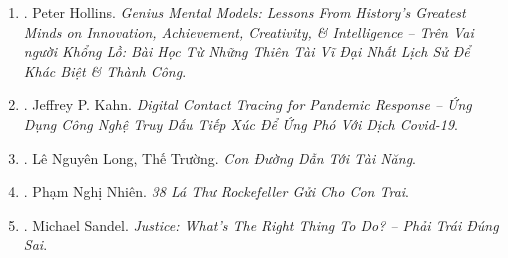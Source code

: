 \documentclass{article}
\begin{document}
\begin{enumerate}
	{\sc Peter Hollins} has studied psychology \& peak human performance for over a dozen years. This book represents scientifically proven methods he has used to become an expert in multiple domains.
	
	Most helpful mental models directly from their sources.
	\begin{itemize}
		\item How {\sc Einstein}'s hobbies helped his genius.
		\item {\sc Napoleon}'s key to conquering nations \& cementing legacy (củng cố di sản).
		\item What {\sc Descartes} had to say about demons.
		\item {\sc Darwin}'s Golden Rule \& how it changed his life.
		\item {\sc Tesla, Edison}, \& battle of approaches \& philosophies.
		\item {\sc Copernicus, Galileo}, \& values of non-convention.
		\item {\sc Sun Tzu}'s imagination of wartime strategies to daily life
		\item {\sc Mozart} \& value of being an empty pitcher to be filled to brim
		\item Unique team that {\sc Abraham Lincoln} surrounded himself with.
	\end{itemize}
	
	\item \cite{Hollins_genius_mental_models_VN}. {\sc Peter Hollins}. {\it Genius Mental Models: Lessons From History's Greatest Minds on Innovation, Achievement, Creativity, \& Intelligence -- Trên Vai người Khổng Lồ: Bài Học Từ Những Thiên Tài Vĩ Đại Nhất Lịch Sử Để Khác Biệt \& Thành Công}.\hfill{\sf[done]}
	
	\item \cite{Kahn_diginal_pandemic_VN}. {\sc Jeffrey P. Kahn}. {\it Digital Contact Tracing for Pandemic Response -- Ứng Dụng Công Nghệ Truy Dấu Tiếp Xúc Để Ứng Phó Với Dịch Covid-19}.\hfill{\sf[done]}
	
	\item \cite{Long_Truong_talent}. {\sc Lê Nguyên Long, Thế Trường}. {\it Con Đường Dẫn Tới Tài Năng}.\hfill{\sf[done]}
	
	\item \cite{Nhien_Rockefeller}. {\sc Phạm Nghị Nhiên}. {\it 38 Lá Thư Rockefeller Gửi Cho Con Trai}.\hfill{\sf[done]}
	
	\item \cite{Sandel_justice}. {\sc Michael Sandel}. {\it Justice: What's The Right Thing To Do? -- Phải Trái Đúng Sai}.\hfill{\sf[done]}
	

\end{enumerate}
\end{document}

